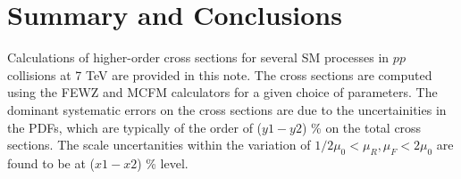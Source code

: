 \section{Summary and Conclusions}
\label{sec:conclusion}
Calculations of higher-order cross sections for several SM processes in $pp$ collisions at 7 TeV are provided 
in this note. The cross sections are computed using the FEWZ and MCFM calculators for a given choice of parameters.
The dominant systematic errors on the cross sections are due to the uncertainities in the PDFs, which 
are typically of the order of ($y1-y2$) \% on the total cross sections. The scale uncertanities within 
the variation of $1/2 \mu_0 < \mu_R, \mu_F < 2\mu_0$ are found to be at ($x1-x2$) \% level. 
 
